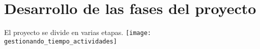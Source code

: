\chapter{Desarrollo de las fases del proyecto}








\graphicspath{{imagenes/estructura_y_desarrollo/}}
El proyecto se divide en varias etapas.
\texttt{[image: gestionando\_tiempo\_actividades]}